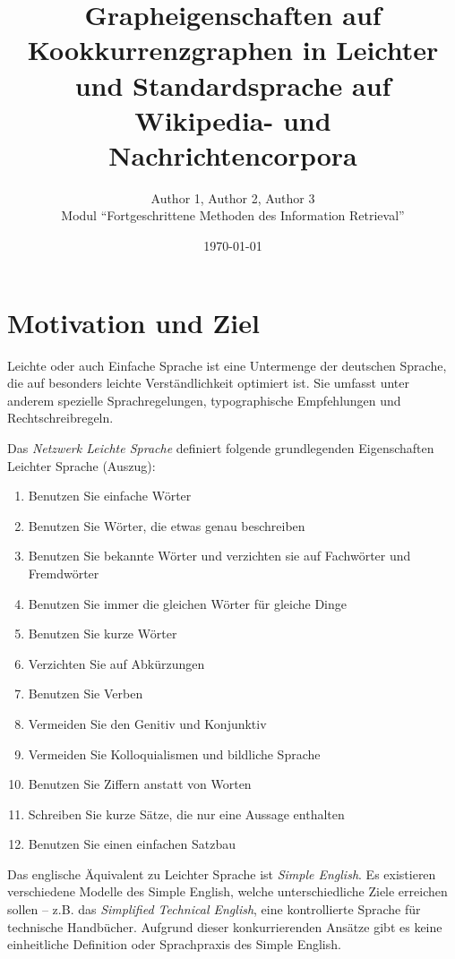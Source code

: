 \documentclass[11pt, a4paper]{article}
\title{Grapheigenschaften auf Kookkurrenzgraphen in Leichter und
    Standardsprache auf Wikipedia- und Nachrichtencorpora}
\author{Author 1, Author 2, Author 3\\
    Modul "`Fortgeschrittene Methoden des Information Retrieval"'}
\date{\today}
\begin{document}
\maketitle
\tableofcontents

\section{Motivation und Ziel}

Leichte oder auch Einfache Sprache ist eine Untermenge der deutschen Sprache,
die auf besonders leichte Verst\"andlichkeit optimiert ist. Sie umfasst unter
anderem spezielle Sprachregelungen, typographische Empfehlungen und
Rechtschreibregeln. 

Das \emph{Netzwerk Leichte Sprache} definiert folgende grundlegenden
Eigenschaften Leichter Sprache\cite{nls_regeln} (Auszug):

\begin{enumerate}
	\item Benutzen Sie einfache W\"orter
	\item Benutzen Sie W\"orter, die etwas genau beschreiben
	\item Benutzen Sie bekannte W\"orter und verzichten sie auf Fachw\"orter und Fremdw\"orter
	\item Benutzen Sie immer die gleichen W\"orter f\"ur gleiche Dinge
	\item Benutzen Sie kurze W\"orter
	\item Verzichten Sie auf Abk\"urzungen
	\item Benutzen Sie Verben
	\item Vermeiden Sie den Genitiv und Konjunktiv
	\item Vermeiden Sie Kolloquialismen und bildliche Sprache
	\item Benutzen Sie Ziffern anstatt von Worten
	\item Schreiben Sie kurze S\"atze, die nur eine Aussage enthalten
	\item Benutzen Sie einen einfachen Satzbau
\end{enumerate}

Das englische \"Aquivalent zu Leichter Sprache ist \emph{Simple English}. Es
existieren verschiedene Modelle des Simple English, welche unterschiedliche
Ziele erreichen sollen -- z.B. das \emph{Simplified Technical English}, eine
kontrollierte Sprache f\"ur technische Handb\"ucher. Aufgrund dieser
konkurrierenden Ans\"atze gibt es keine einheitliche Definition oder
Sprachpraxis des Simple English.
\end{document}
